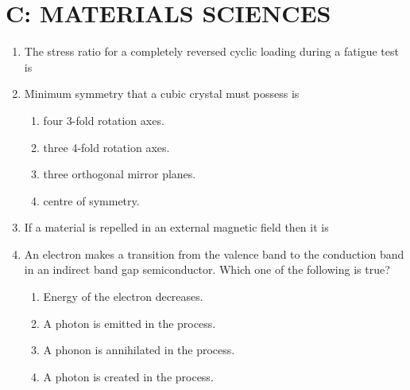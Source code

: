 \documentclass[a4paper,10pt]{article}
\begin{document}
\clearpage

\section*{C: MATERIALS SCIENCES}
\begin{enumerate}
    \item The stress ratio for a completely reversed cyclic loading during a fatigue test is
    \hfill{}
    \begin{enumerate}[label=\Alph*)]
    \end{enumerate}

    \item Minimum symmetry that a cubic crystal must possess is
    \hfill{}
    \begin{enumerate}[label=\Alph*)]
        \item four 3-fold rotation axes.
        \item three 4-fold rotation axes.
        \item three orthogonal mirror planes.
        \item centre of symmetry.
    \end{enumerate}

    \item If a material is repelled in an external magnetic field then it is
    \hfill{}
    \begin{enumerate}[label=\Alph*)]
    \end{enumerate}

    \item An electron makes a transition from the valence band to the conduction band in an indirect band gap semiconductor. Which one of the following is true?
    \hfill{}
    \begin{enumerate}[label=\Alph*)]
        \item Energy of the electron decreases.
        \item A photon is emitted in the process.
        \item A phonon is annihilated in the process.
        \item A photon is created in the process.
    \end{enumerate}


\end{enumerate}
\end{document}
